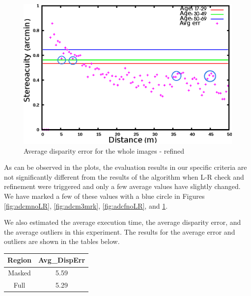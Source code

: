 \begin{figure}[H]
\centering
\includegraphics[scale=0.95]{adcenfull3mrk}
\caption{Average disparity error for the whole images - refined}
\label{fig:adcf3mrk}
\end{figure} 

As can be observed in the plots, the evaluation results in our specific criteria 
are not significantly different from the results of the algorithm when L-R check and refinement were triggered
and only a few average values have slightly changed. We have marked a few of these values with a blue circle in Figures \ref{fig:adcmnoLR}, \ref{fig:adcm3mrk}, 
\ref{fig:adcfnoLR}, and \ref{fig:adcf3mrk}.

We also estimated the average execution time, the average disparity error, and the average outliers in this experiment. The results for 
the average error and outliers are shown in the tables below. \newline

\begin{minipage}{\linewidth}
\begin{center}
\label{tab:adcerrNref}
\begin{tabular}{|c|c|}
\hline
Region & Avg\_DispErr \\ \hline
Masked & 5.59 \\  \hline
Full & 5.29 \\ \hline
\end{tabular}
\end{center}
\end{minipage} \newline \newline

